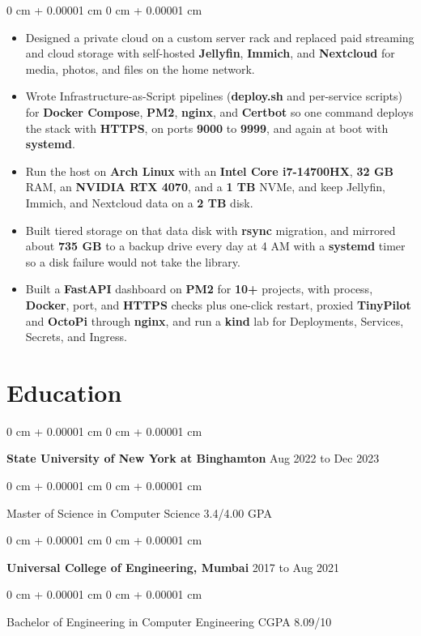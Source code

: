 \documentclass[10pt, letterpaper]{article}
\newenvironment{highlights}{
    \begin{itemize}[
        topsep=0.05 cm,
        parsep=0.03 cm,
        partopsep=0pt,
        itemsep=0.04 cm,
        leftmargin=0 cm + 10pt
    ]
}{
    \end{itemize}
} %
\newenvironment{onecolentry}{
    \begin{adjustwidth}{
        0 cm + 0.00001 cm
    }{
        0 cm + 0.00001 cm
    }
}{
    \end{adjustwidth}
} %
\newcommand{\resumeheading}[2]{%
    \begin{onecolentry}
        #1 \hfill #2
    \end{onecolentry}
} %
\begin{document}
\begin{onecolentry}
\begin{highlights}
	\item Designed a private cloud on a custom server rack and replaced paid streaming and cloud storage with self-hosted \textbf{Jellyfin}, \textbf{Immich}, and \textbf{Nextcloud} for media, photos, and files on the home network.
	\item Wrote Infrastructure-as-Script pipelines (\textbf{deploy.sh} and per-service scripts) for \textbf{Docker Compose}, \textbf{PM2}, \textbf{nginx}, and \textbf{Certbot} so one command deploys the stack with \textbf{HTTPS}, on ports \textbf{9000} to \textbf{9999}, and again at boot with \textbf{systemd}.
	\item Run the host on \textbf{Arch Linux} with an \textbf{Intel Core i7-14700HX}, \textbf{32 GB} RAM, an \textbf{NVIDIA RTX 4070}, and a \textbf{1 TB} NVMe, and keep Jellyfin, Immich, and Nextcloud data on a \textbf{2 TB} disk.
	\item Built tiered storage on that data disk with \textbf{rsync} migration, and mirrored about \textbf{735 GB} to a backup drive every day at 4 AM with a \textbf{systemd} timer so a disk failure would not take the library.
	\item Built a \textbf{FastAPI} dashboard on \textbf{PM2} for \textbf{10+} projects, with process, \textbf{Docker}, port, and \textbf{HTTPS} checks plus one-click restart, proxied \textbf{TinyPilot} and \textbf{OctoPi} through \textbf{nginx}, and run a \textbf{kind} lab for Deployments, Services, Secrets, and Ingress.
\end{highlights}
\end{onecolentry}


\vspace{0.14 cm}

\section{Education}

\resumeheading{\textbf{State University of New York at Binghamton}}{Aug 2022 to Dec 2023}

\begin{onecolentry}
	Master of Science in Computer Science \hfill 3.4/4.00 GPA
\end{onecolentry}

\vspace{0.16 cm}

\resumeheading{\textbf{Universal College of Engineering, Mumbai}}{2017 to Aug 2021}

\begin{onecolentry}
	Bachelor of Engineering in Computer Engineering \hfill CGPA 8.09/10
\end{onecolentry}
\end{document}
